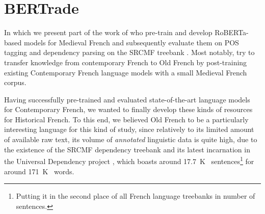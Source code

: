 \chapter{BERTrade}\label{chap:bertrade}

\begin{center}
    \begin{minipage}{0.66\textwidth}
        \begin{small}
            In which we present part of the work of \citet{grobol-etal-2022-bertrade} who pre-train and develop RoBERTa-based \citep{liu-etal-2019-roberta} models for Medieval French and subsequently evaluate them on POS tagging and dependency parsing on the SRCMF treebank \citep{prevost-stein-2013-syntactic}. Most notably, \citet{grobol-etal-2022-bertrade} try to transfer knowledge from contemporary French to Old French by post-training existing Contemporary French language models with a small Medieval French corpus.\footnotemark
        \end{small}
    \end{minipage}
    \vspace{0.5cm}
\end{center}


Having successfully pre-trained and evaluated state-of-the-art language models for Contemporary French, we wanted to finally develop these kinds of resources for Historical French. To this end, we believed Old French to be a particularly interesting language for this kind of study, since relatively to its limited amount of available raw text, its volume of \emph{annotated} linguistic data is quite high, due to the existence of the SRCMF dependency treebank \citep{prevost-stein-2013-syntactic} and its latest incarnation in the Universal Dependency project \citep{nivre-etal-2020-universal}, which boasts around \SI{17.7}{K\quantity} sentences\footnote{Putting it in the second place of all French language treebanks in number of sentences.} for around \SI{171}{K\quantity} words.

